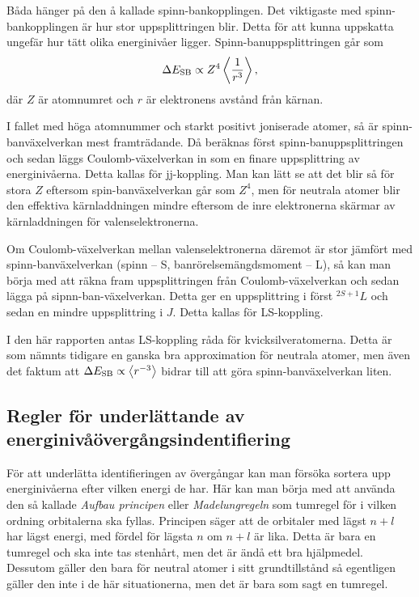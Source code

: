 \documentclass[11pt,a4paper]{article}
\begin{document}
Båda hänger på den å kallade spinn-bankopplingen. Det viktigaste med
spinn-bankopplingen är hur stor uppsplittringen blir. Detta för att kunna
uppskatta ungefär hur tätt olika energinivåer ligger. Spinn-banuppsplittringen
går som\cite{Bransden} 
\[
\Delta E_\text{SB} \propto Z^4 \ev{\frac{1}{r^3}},
\]
där $Z$ är atomnumret och $r$ är elektronens avstånd från kärnan.

I fallet med höga atomnummer och starkt positivt joniserade atomer, så är
spinn-banväxelverkan mest framträdande. Då beräknas först
spinn-banuppsplittringen och sedan läggs Coulomb-växelverkan in som en
finare uppsplittring av energinivåerna. Detta kallas för
jj-koppling. Man kan lätt se att det blir så för stora $Z$ eftersom
spin-banväxelverkan går som $Z^4$, men för neutrala atomer blir den
effektiva kärnladdningen mindre eftersom de inre elektronerna skärmar
av kärnladdningen för valenselektronerna. 

Om Coulomb-växelverkan mellan valenselektronerna däremot är stor
jämfört med spinn-banväxelverkan (spinn -- S, banrörelsemängdsmoment
-- L), så kan man börja med att räkna fram uppsplittringen från
Coulomb-växelverkan och sedan lägga på sipnn-ban-växelverkan. Detta
ger en uppsplittring i först $^{2S+1}L$ och sedan en mindre
uppsplittring i $J$. Detta kallas för LS-koppling. 

I den här rapporten antas LS-koppling råda för
kvicksilveratomerna. Detta är som nämnts tidigare en ganska bra
approximation för neutrala atomer, men även det faktum att $\Delta
E_\text{SB} \propto \ev{r^{-3}}$ bidrar till att göra
spinn-banväxelverkan liten. 



\subsection{Regler för underlättande av energinivåövergångsindentifiering} 
\label{sec:regler}
För att underlätta identifieringen av övergångar kan man försöka
sortera upp energinivåerna efter vilken energi de har. Här kan man
börja med att använda den så kallade \emph{Aufbau principen} eller
\emph{Madelungregeln} som tumregel för i vilken ordning orbitalerna
ska fyllas\cite{wiki:aufbau}. Principen säger att de orbitaler med 
lägst $n+l$ har lägst energi, med fördel för lägsta $n$ om $n+l$ är
lika. Detta är bara en tumregel och ska inte tas stenhårt, men det 
är ändå ett bra hjälpmedel. Dessutom gäller den bara för neutral 
atomer i sitt grundtillstånd så egentligen gäller den inte i de här
situationerna, men det är bara som sagt en tumregel.
\end{document}
